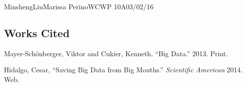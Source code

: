 \documentclass[12pt,letterpaper]{article}
\begin{document}
\begin{mla}{Minsheng}{Liu}{Marissa Perino}{WCWP 10A}{03/02/16}
\subsection*{Works Cited}
\bibent Mayer-Schönberger, Viktor and Cukier, Kenneth. ``Big Data.'' 2013. Print.

\bibent Hidalgo, Cesar, ``Saving Big Data from Big Mouths.'' \textit{Scientific American} 2014. Web.

\end{mla}
\end{document}
